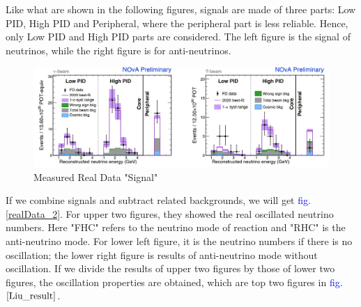 \documentclass[a4paper,12pt]{article}
\begin{document}
Like what are shown in the following figures, signals are made of three parts: Low PID, High PID and Peripheral, where the peripheral part is less reliable. Hence, only Low PID and High PID parts are considered. The left figure is the signal of neutrinos, while the right figure is for anti-neutrinos. 
\begin{figure}[H]
    \centering
    \includegraphics[scale=0.5]{Images/nominator.JPG}
    \caption{Measured Real Data "Signal"}
    \label{realData_1}
\end{figure}

If we combine signals and subtract related backgrounds, we will get \textcolor{blue}{fig.\ref{realData_2}}.
For upper two figures, they showed the real oscillated neutrino numbers. Here "FHC" refers to the neutrino mode of reaction and "RHC" is the anti-neutrino mode.
For lower left figure, it is the neutrino numbers if there is no oscillation; the lower right figure is results of anti-neutrino mode without oscillation. If we divide the results of upper two figures by those of lower two figures, the oscillation properties are obtained, which are top two figures in \textcolor{blue}{fig.$\ref{Liu_result}$}.
\end{document}
